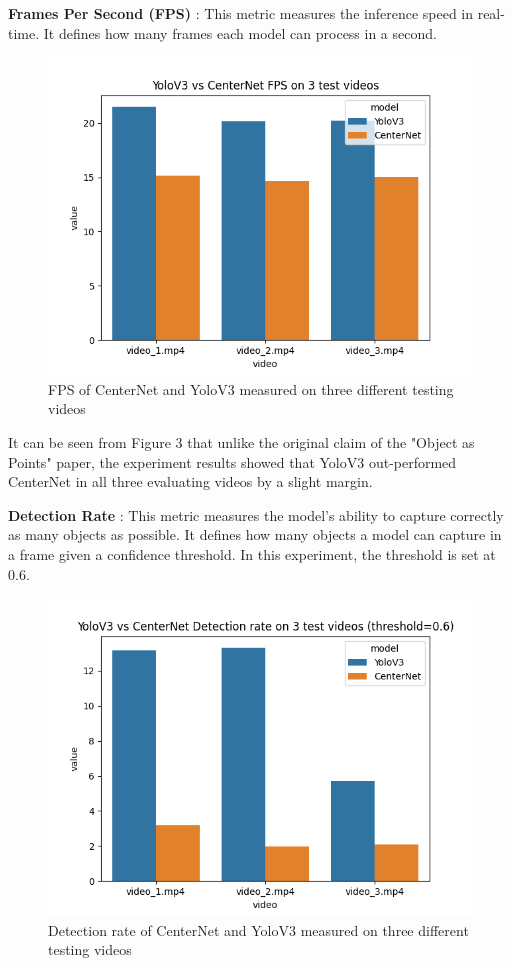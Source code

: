 \documentclass[12pt]{article}
\begin{document}
\textbf{Frames Per Second (FPS)} : This metric measures the inference speed in real-time. It defines how many frames each model can process in a second.
\begin{figure}[H]
    \centering
    \captionsetup{justification=centering}
    \includegraphics[scale=0.8]{images/fps_yolo_vs_centernet.png}
    \caption{FPS of CenterNet and YoloV3 measured on three different testing videos}
\end{figure}

It can be seen from Figure 3 that unlike the original claim of the "Object as Points" paper, the experiment results showed that YoloV3 out-performed CenterNet in all three evaluating videos by a slight margin.\newline

\textbf{Detection Rate} : This metric measures the model's ability to capture correctly as many objects as possible. It defines how many objects a model can capture in a frame given a  confidence threshold. In this experiment, the threshold is set at 0.6.

\begin{figure}[H]
    \centering
    \captionsetup{justification=centering}
    \includegraphics[scale=0.8]{images/dr_yolo_vs_centernet.png}
    \caption{Detection rate of CenterNet and YoloV3 measured on three different testing videos}
\end{figure}
\end{document}
